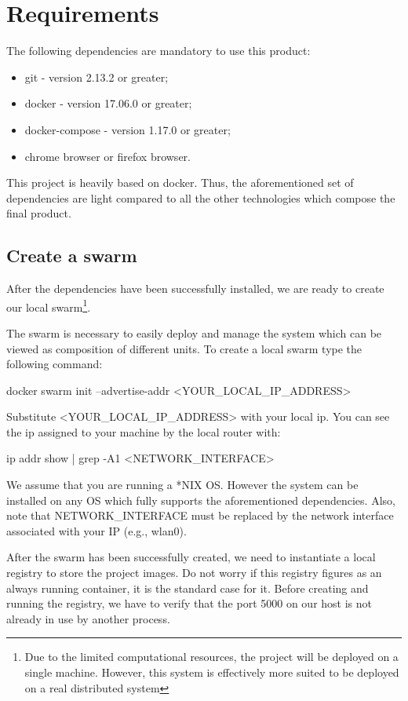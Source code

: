 \section{Requirements}\label{req}

The following dependencies are mandatory to use this product:
\begin{itemize}
   \item git - version 2.13.2 or greater;
   \item docker - version 17.06.0 or greater;
   \item docker-compose - version 1.17.0 or greater;
   \item chrome browser or firefox browser.
\end{itemize}

This project is heavily based on docker. Thus, the aforementioned
set of dependencies are light compared to all the other
technologies which compose the final product.

\subsection{Create a swarm}
After the dependencies have been successfully installed,
we are ready to create our local swarm\footnote{Due to the limited computational
resources, the project will be deployed on a single machine. However, this system
is effectively more suited to be deployed on a real distributed system}.

The swarm is necessary to easily deploy and manage the system which can be
viewed as composition of different units. To create a local swarm
type the following command:

docker swarm init --advertise-addr <YOUR_LOCAL_IP_ADDRESS>

Substitute <YOUR_LOCAL_IP_ADDRESS> with your local ip.
You can see the ip assigned to your machine by the local router with:

ip addr show | grep -A1 <NETWORK_INTERFACE>

We assume that you are running a *NIX OS. However the system can be installed
on any OS which fully supports the aforementioned dependencies.
Also, note that NETWORK_INTERFACE must
be replaced by the network interface associated with your IP (e.g., wlan0).


After the swarm has been successfully created, we need to instantiate a local
registry to store the project images. Do not worry if this registry figures as
an always running container, it is the standard case for it.
Before creating and running the registry, we have to verify that the port 5000
on our host is not already in use by another process.

